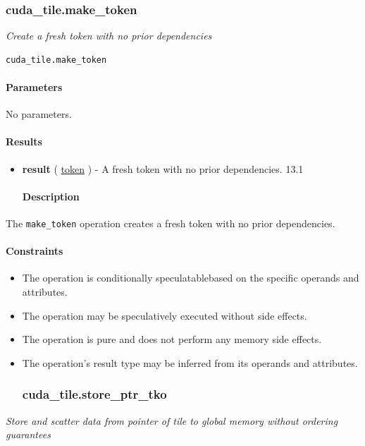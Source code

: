 \documentclass{article}
\begin{document}
\subsubsection{cuda\_tile.make\_token}

\textit{Create a fresh token with no prior dependencies}


\begin{lstlisting}
cuda_tile.make_token
\end{lstlisting}

\paragraph{Parameters}

No parameters.



\paragraph{Results}

\begin{itemize}
\item \textbf{result} ( \href{https://docs.nvidia.com/cuda/tile-ir/latest/sections/operations.html#type-token}{token} ) - A fresh token with no prior dependencies. 13.1


\paragraph{Description}

\end{itemize}
The \texttt{make\_token} operation creates a fresh token with no prior dependencies.



\paragraph{Constraints}

\begin{itemize}
\item The operation is conditionally speculatablebased on the specific operands and attributes.
\item The operation may be speculatively executed without side effects.
\item The operation is pure and does not perform any memory side effects.
\item The operation's result type may be inferred from its operands and attributes.


\subsubsection{cuda\_tile.store\_ptr\_tko}

\end{itemize}
\textit{Store and scatter data from pointer of tile to global memory without ordering guarantees}
\end{document}
